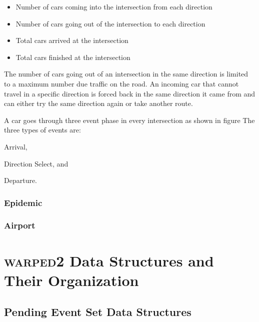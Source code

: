 \documentclass[11pt]{book}
\begin{document}
\begin{itemize}
    \item Number of cars coming into the intersection from each direction
    \item Number of cars going out of the intersection to each direction
    \item Total cars arrived at the intersection
    \item Total cars finished at the intersection
\end{itemize}

The number of cars going out of an intersection in the same direction is limited to a
maximum number due traffic on the road. An incoming car that cannot travel in a specific
direction is forced back in the same direction it came from and can either try the same
direction again or take another route.

A car goes through three event phase in every intersection as shown in figure
The three types of events are: \begin{inparaenum}[(1)] \item Arrival,
\item Direction Select, and \item Departure. \end{inparaenum}


\subsection{Epidemic}

\subsection{Airport}



\chapter{\textsc{warped2} Data Structures and Their Organization}\label{warped2_ds}

\section{Pending Event Set Data Structures}
\end{document}
